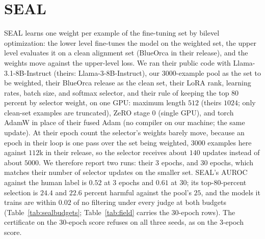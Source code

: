 \documentclass{article} %
\makeatletter
\newcommand{\tabinput}[1]{\@@input#1 }
\makeatother
\begin{document}
\section{SEAL}
\label{app:seal}
SEAL \citep{shen2025seal} learns one weight per example of the fine-tuning set by bilevel optimization: the lower level fine-tunes the model on the weighted set, the upper level evaluates it on a clean alignment set (BlueOrca in their release), and the weights move against the upper-level loss. We ran their public code with Llama-3.1-8B-Instruct (theirs: Llama-3-8B-Instruct), our $3000$-example pool as the set to be weighted, their BlueOrca release as the clean set, their LoRA rank, learning rates, batch size, and softmax selector, and their rule of keeping the top $80$ percent by selector weight, on one GPU: maximum length $512$ (theirs $1024$; only clean-set examples are truncated), ZeRO stage $0$ (single GPU), and torch AdamW in place of their fused Adam (no compiler on our machine; the same update). At their epoch count the selector's weights barely move, because an epoch in their loop is one pass over the set being weighted, $3000$ examples here against $112$k in their release, so the selector receives about $140$ updates instead of about $5000$. We therefore report two runs: their $3$ epochs, and $30$ epochs, which matches their number of selector updates on the smaller set. SEAL's AUROC against the human label is $0.52$ at $3$ epochs and $0.61$ at $30$; its top-$80$-percent selection is $24.4$ and $22.6$ percent harmful against the pool's $25$, and the models it trains are within $0.02$ of no filtering under every judge at both budgets (Table~\ref{tab:sealbudgets}; Table~\ref{tab:field} carries the $30$-epoch rows). The certificate on the $30$-epoch score refuses on all three seeds, as on the $3$-epoch score.
\begin{table}[h]
\centering\small
\caption{SEAL at both selector budgets, and its score under the pooled and stratified certificates, in the setting of Table~\ref{tab:field}. Bold: lowest harm per column among the SEAL conditions.}
\label{tab:sealbudgets}
\resizebox{\linewidth}{!}{\tabinput{data/tables/seal_budgets.tex}}
\end{table}
\end{document}
